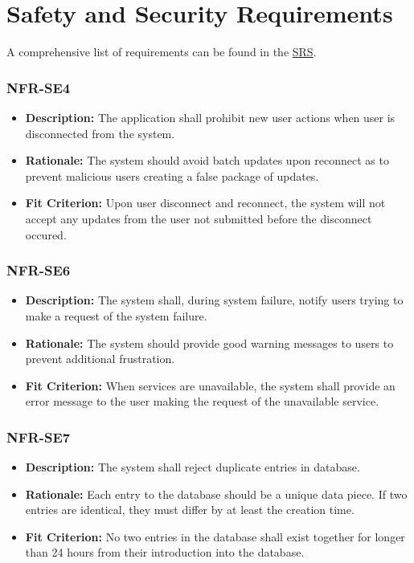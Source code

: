 \documentclass{article}
\begin{document}
\normalsize
\newpage
\section{Safety and Security Requirements}

A comprehensive list of requirements can be found in the \href{https://github.com/OKKM-insights/OKKM.insights/blob/main/docs/SRS/SRS.pdf}{SRS}.

\subsubsection*{NFR-SE4}
\begin{itemize}
  \item \textbf{Description:} The application shall prohibit new user actions when user is disconnected from the system.
  \item \textbf{Rationale:} The system should avoid batch updates upon reconnect as to prevent malicious users creating a false package of updates.
  \item \textbf{Fit Criterion:} Upon user disconnect and reconnect, the system will not accept any updates from the user not submitted before the disconnect occured.
\end{itemize}

\subsubsection*{NFR-SE6}
\begin{itemize}
  \item \textbf{Description:} The system shall, during system failure, notify users trying to make a request of the system failure.
  \item \textbf{Rationale:} The system should provide good warning messages to users to prevent additional frustration.
  \item \textbf{Fit Criterion:} When services are unavailable, the system shall provide an error message to the user making the request of the unavailable service.
\end{itemize}

\subsubsection*{NFR-SE7}
\begin{itemize}
  \item \textbf{Description:} The system shall reject duplicate entries in database.
  \item \textbf{Rationale:} Each entry to the database should be a unique data piece. If two entries are identical, they must differ by at least the creation time.
  \item \textbf{Fit Criterion:} No two entries in the database shall exist together for longer than 24 hours from their introduction into the database.
\end{itemize}
\end{document}
